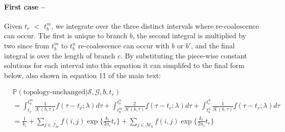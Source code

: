 \documentclass[11pt]{article}
\begin{document}





\paragraph{First case --} Given $t_r$ $<$ $t_b^m$, we integrate over the three
distinct intervals where re-coalescence can occur. The first is unique to branch $b$, 
the second integral is multiplied by two since from $t_b^m$ to $t_b^u$ re-coalescence
can occur with $b$ or $b'$, and the final integral is over the length of branch $c$.
By substituting the piece-wise constant solutions for each interval into this equation
it can simplifed to the final form below, also shown in equation 11 of the main text:

\begin{equation}
\begin{aligned}
	&\mathbb{P}(\text{topology-unchanged} | \mathcal{S}, \mathcal{G}, b, t_r) \\
	&= \int_{t_r}^{t_b^m}
	\frac{1}{\mathcal{K}(b,\tau)} f(\tau - t_r; \lambda) d\tau + 
	\int_{t_b^m}^{t_b^u}
	\frac{2}{\mathcal{K}(b,\tau)} f(\tau - t_r; \lambda) d\tau + 
	\int_{t_b^u}^{t_c^u} \frac{1}{\mathcal{K}(b,\tau)} f(\tau - t_r; \lambda) d\tau \\
	&= \frac{1}{k_i} + 
	\sum_{j \in \mathcal{I}_{bc}}	f(i,j) \exp \bigg\{	\frac{k_i}{2n_i} t_r \bigg\} + 
	\sum_{j \in \mathcal{M}_b}    f(i,j) \exp \bigg\{ \frac{k_i}{2n_i} t_r \bigg\}
\end{aligned}
\end{equation}
\end{document}

